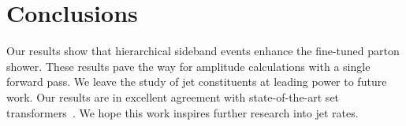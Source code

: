 \section{Conclusions}\label{sec:conclusions}

Our results show that hierarchical sideband events enhance the
fine-tuned parton shower. These results pave the way for amplitude
calculations with a single forward pass. We leave the study of jet
constituents at leading power to future work. Our results are in
excellent agreement with state-of-the-art set
transformers~\cite{TPC:0727-Spectral-Score-Based-Generative-Models-for-Strong-Coupling-Extraction-September-29-2026}.
We hope this work inspires further research into jet rates.

